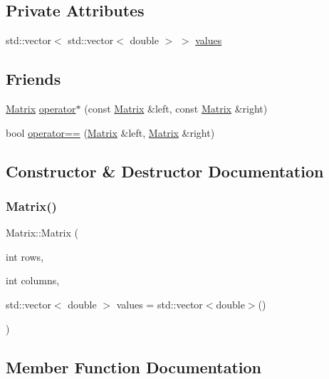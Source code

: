 \subsection*{Private Attributes}
\begin{DoxyCompactItemize}
\item 
std\+::vector$<$ std\+::vector$<$ double $>$ $>$ \hyperlink{classMatrix_a5987175ae045377790ff0b1f6cfd2e7b}{values}
\end{DoxyCompactItemize}
\subsection*{Friends}
\begin{DoxyCompactItemize}
\item 
\hyperlink{classMatrix}{Matrix} \hyperlink{classMatrix_a6b58c286243be002bf669704ad15353a}{operator$\ast$} (const \hyperlink{classMatrix}{Matrix} \&left, const \hyperlink{classMatrix}{Matrix} \&right)
\item 
bool \hyperlink{classMatrix_a9407333bda2f3bf7b8a7ca9bec61b8ce}{operator==} (\hyperlink{classMatrix}{Matrix} \&left, \hyperlink{classMatrix}{Matrix} \&right)
\end{DoxyCompactItemize}


\subsection{Constructor \& Destructor Documentation}
\mbox{\label{classMatrix_a5d39846f7d1e7f2f0ca9cb49117221e1}} 
\subsubsection{\texorpdfstring{Matrix()}{Matrix()}}
{\footnotesize\ttfamily Matrix\+::\+Matrix (\begin{DoxyParamCaption}\item[{int}]{rows,  }\item[{int}]{columns,  }\item[{std\+::vector$<$ double $>$}]{values = {\ttfamily std\+:\+:vector$<$double$>$()} }\end{DoxyParamCaption})}



\subsection{Member Function Documentation}
\mbox{\label{classMatrix_a37d08315d9b28e5922e1a75b4d2a4cb9}} 
